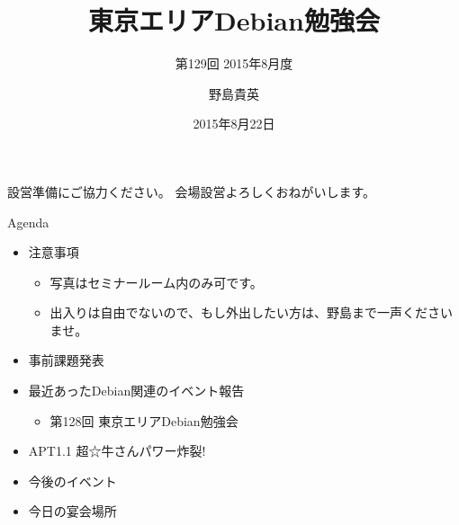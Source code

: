 \title{東京エリアDebian勉強会}
\subtitle{第129回 2015年8月度}
\author{野島貴英}
\date{2015年8月22日}



\begin{frame}
\titlepage{}
\end{frame}

\begin{frame}{設営準備にご協力ください。}
会場設営よろしくおねがいします。
\end{frame}

\begin{frame}{Agenda}
 \begin{minipage}[t]{0.45\hsize}
  \begin{itemize}
   \item 注意事項
	 \begin{itemize}
	  \item 写真はセミナールーム内のみ可です。
          \item 出入りは自由でないので、もし外出したい方は、野島まで一声くださいませ。
	 \end{itemize}
   \item 事前課題発表
  \end{itemize}
 \end{minipage} 
 \begin{minipage}[t]{0.45\hsize}
  \begin{itemize}
   \item 最近あったDebian関連のイベント報告
	 \begin{itemize}
	 \item 第128回 東京エリアDebian勉強会
	 \end{itemize}
   \item APT1.1 超☆牛さんパワー炸裂!
   \item 今後のイベント
   \item 今日の宴会場所
  \end{itemize}
 \end{minipage}
\end{frame}

